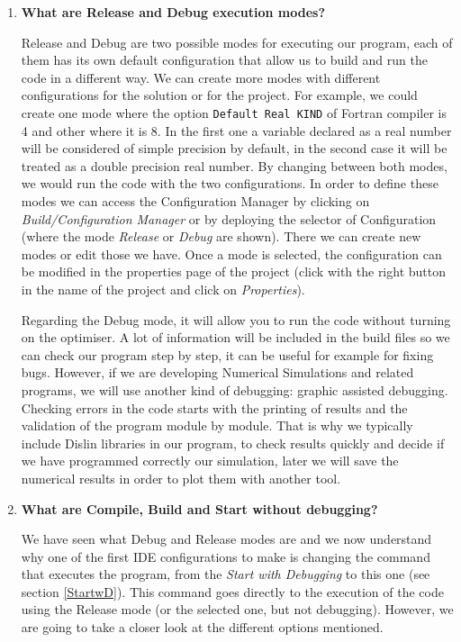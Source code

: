\begin{enumerate}
    
    \item \textbf{What are Release and Debug execution modes?} 
    
    Release and Debug are two possible modes for executing our program, each of them has its own default configuration that allow us to build and run the code in a different way. We can create more modes with different configurations for the solution or for the project. For example, we could create one mode where the option \texttt{Default Real KIND} of Fortran compiler is 4 and other where it is 8. In the first one a variable declared as a real number will be considered of simple precision by default, in the second case it will be treated as a double precision real number. By changing between both modes, we would run the code with the two configurations. In order to define these modes we can access the Configuration Manager by clicking on \textit{Build/Configuration Manager} or by deploying the selector of Configuration (where the mode \textit{Release} or \textit{Debug} are shown). There we can create new modes or edit those we have. Once a mode is selected, the configuration can be modified in the properties page of the project (click with the right button in the name of the project and click on \textit{Properties}). 
   
    Regarding the Debug mode, it will allow you to run the code without turning on the optimiser. A lot of information will be included in the build files so we can check our program step by step, it can be useful for example for fixing bugs. However, if we are developing Numerical Simulations and related programs, we will use another kind of debugging: graphic assisted debugging. Checking errors in the code starts with the printing of results and the validation of the program module by module. That is why we typically include Dislin libraries in our program, to check results quickly and decide if we have programmed correctly our simulation, later we will save the numerical results in order to plot them with another tool. 
    
    \item \textbf{What are Compile, Build and Start without debugging?}
    
    We have seen what Debug and Release modes are and we now understand why one of the first IDE configurations to make is changing the command that executes the program, from the \textit{Start with Debugging} to this one (see section \ref{StartwD}). This command goes directly to the execution of the code using the Release mode (or the selected one, but not debugging). However, we are going to take a closer look at the different options mentioned.
    

\end{enumerate}
